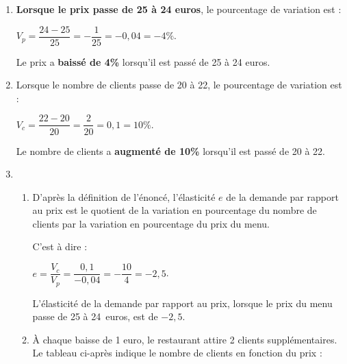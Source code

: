 \begin{corrige}
     \par
     \begin{enumerate}
          \item %
          \textbf{Lorsque le prix passe de 25 à 24 euros}, le pourcentage de variation est :
          \par
          $V_p=\dfrac{24-25}{25}=-\dfrac{1}{25}=-0,04=-4\%$.
          \par
          Le prix a \textbf{baissé de 4\%} lorsqu'il est passé de 25 à 24 euros.
          \item %
          Lorsque le nombre de clients passe de 20 à 22, le pourcentage de variation est :
          \par
          $ V_c=\dfrac{22-20}{20}=\dfrac{2}{20}=0,1=10\%. $
          \par
          Le nombre de clients a \textbf{augmenté de 10\%} lorsqu'il est passé de 20 à 22.
          \item %
          \begin{enumerate}[label=\alph*.]
               \item %
               D'après la définition de l'énoncé, l'élasticité $e$ de la demande par rapport au prix est le quotient de la variation en pourcentage du nombre de clients par la variation en pourcentage du prix du menu.
               \par
               C'est à dire :
               \par
               $e=\dfrac{V_c}{V_p}=\dfrac{0,1}{-0,04}=-\dfrac{10}{4}=-2,5$.
               \par
               L'élasticité de la demande par rapport au prix, lorsque le prix du menu passe de 25 à 24~euros, est de $-2,5$.
               \item %
               \`A chaque baisse de 1 euro, le restaurant attire 2 clients supplémentaires. Le tableau ci-après indique le nombre de clients en fonction du prix :
               \par
               \begin{center}

\end{center}
\end{enumerate}
\end{enumerate}
\end{corrige}
